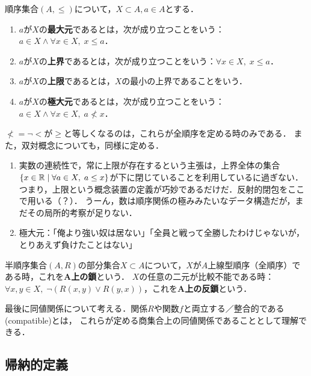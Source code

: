 \documentclass[uplatex, dvipdfmx]{jsreport}
\begin{document}
\begin{definition}
    順序集合$(A,\le)$について，$X\subset A, a\in A$とする．
    \begin{enumerate}
        \item $a$が$X$の\textbf{最大元}であるとは，次が成り立つことをいう：$a\in X\land \forall x\in X,\; x\le a$．
        \item $a$が$X$の\textbf{上界}であるとは，次が成り立つことをいう：$\forall x\in X,\; x\le a$．
        \item $a$が$X$の\textbf{上限}であるとは，$X$の最小の上界であることをいう．
        \item $a$が$X$の\textbf{極大元}であるとは，次が成り立つことをいう：$a\in X\land\forall x\in X,\; a\nless x$．
    \end{enumerate}
    $\nless = \lnot<$が$\ge$と等しくなるのは，これらが全順序を定める時のみである．
    また，双対概念についても，同様に定める．
\end{definition}
\begin{remark}\mbox{}
    \begin{enumerate}
        \item 実数の連続性で，常に上限が存在するという主張は，上界全体の集合$\{ x\in\mathbb{R} \mid \forall a\in X,\; a\le x \}$が下に閉じていることを利用しているに過ぎない．
        つまり，上限という概念装置の定義が巧妙であるだけだ．反射的閉包をここで用いる（？）．
        うーん，数は順序関係の極みみたいなデータ構造だが，まだその局所的考察が足りない．
        \item 極大元：「俺より強い奴は居ない」「全員と戦って全勝したわけじゃないが，とりあえず負けたことはない」
    \end{enumerate}
\end{remark}

\begin{definition}
    半順序集合$(A,R)$の部分集合$X\subset A$について，$X$が$A$上線型順序（全順序）である時，これを\textbf{A上の鎖}という．
    $X$の任意の二元が比較不能である時：$\forall x,y\in X,\; \lnot(R(x,y)\lor R(y,x))$，これを\textbf{A上の反鎖}という．
\end{definition}

最後に同値関係について考える．関係$R$や関数$f$と両立する／整合的である(compatible)とは，
これらが定める商集合上の同値関係であることとして理解できる．

\subsection{帰納的定義}
\end{document}

